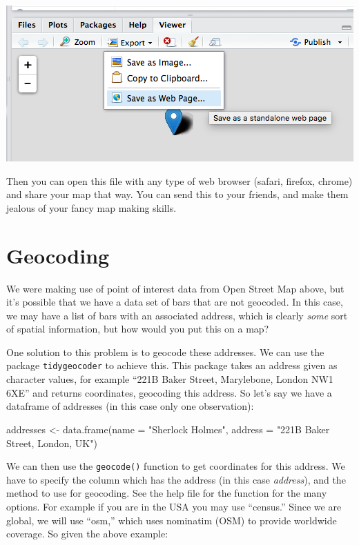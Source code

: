 \documentclass[
]{book}
\newenvironment{Shaded}{\begin{snugshade}}{\end{snugshade}}
\newcommand{\AttributeTok}[1]{\textcolor[rgb]{0.77,0.63,0.00}{#1}}
\newcommand{\FunctionTok}[1]{\textcolor[rgb]{0.00,0.00,0.00}{#1}}
\newcommand{\NormalTok}[1]{#1}
\newcommand{\OtherTok}[1]{\textcolor[rgb]{0.56,0.35,0.01}{#1}}
\newcommand{\StringTok}[1]{\textcolor[rgb]{0.31,0.60,0.02}{#1}}
\begin{document}
\includegraphics{img/save_as_wp.png}

Then you can open this file with any type of web browser (safari, firefox, chrome) and share your map that way. You can send this to your friends, and make them jealous of your fancy map making skills.

\hypertarget{geocoding}{%
\section{Geocoding}\label{geocoding}}

We were making use of point of interest data from Open Street Map above, but it's possible that we have a data set of bars that are not geocoded. In this case, we may have a list of bars with an associated address, which is clearly \emph{some} sort of spatial information, but how would you put this on a map?

One solution to this problem is to geocode these addresses. We can use the package \texttt{tidygeocoder} to achieve this. This package takes an address given as character values, for example ``221B Baker Street, Marylebone, London NW1 6XE'' and returns coordinates, geocoding this address. So let's say we have a dataframe of addresses (in this case only one observation):

\begin{Shaded}
\begin{Highlighting}[]
\NormalTok{addresses }\OtherTok{\textless{}{-}} \FunctionTok{data.frame}\NormalTok{(}\AttributeTok{name =} \StringTok{"Sherlock Holmes"}\NormalTok{, }
                        \AttributeTok{address =} \StringTok{"221B Baker Street, London, UK"}\NormalTok{)}
\end{Highlighting}
\end{Shaded}

We can then use the \texttt{geocode()} function to get coordinates for this address. We have to specify the column which has the address (in this case \emph{address}), and the method to use for geocoding. See the help file for the function for the many options. For example if you are in the USA you may use ``census.'' Since we are global, we will use ``osm,'' which uses nominatim (OSM) to provide worldwide coverage. So given the above example:
\end{document}

